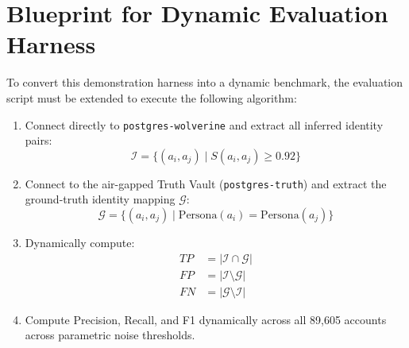 \section{Blueprint for Dynamic Evaluation Harness}
To convert this demonstration harness into a dynamic benchmark, the evaluation script must be extended to execute the following algorithm:
\begin{enumerate}
    \item Connect directly to \texttt{postgres-wolverine} and extract all inferred identity pairs:
    \begin{equation}
    \mathcal{I} = \{ (a_i, a_j) \mid S(a_i, a_j) \ge 0.92 \}
    \end{equation}
    \item Connect to the air-gapped Truth Vault (\texttt{postgres-truth}) and extract the ground-truth identity mapping $\mathcal{G}$:
    \begin{equation}
    \mathcal{G} = \{ (a_i, a_j) \mid \text{Persona}(a_i) = \text{Persona}(a_j) \}
    \end{equation}
    \item Dynamically compute:
    \begin{align}
    TP &= |\mathcal{I} \cap \mathcal{G}| \\
    FP &= |\mathcal{I} \setminus \mathcal{G}| \\
    FN &= |\mathcal{G} \setminus \mathcal{I}|
    \end{align}
    \item Compute Precision, Recall, and F1 dynamically across all 89,605 accounts across parametric noise thresholds.
\end{enumerate}

